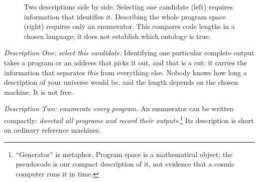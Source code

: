 \begin{figure}[h]
\centering
{}
\caption{Two descriptions side by side. Selecting one candidate (left) requires information that identifies it. Describing the whole program space (right) requires only an enumerator. This compares code lengths in a chosen language; it does not establish which ontology is true.}
\label{fig:cut-argument}
\end{figure}

\emph{Description One: select this candidate.} Identifying one particular complete output takes a program or an address that picks it out, and that is a cut: it carries the information that separates \emph{this} from everything else. Nobody knows how long a description of your universe would be, and the length depends on the chosen machine. It is not free.

\emph{Description Two: enumerate every program.} An enumerator can be written compactly: \emph{dovetail all programs and record their outputs}.\footnote{``Generator'' is metaphor. Program space is a mathematical object; the pseudocode is our compact description of it, not evidence that a cosmic computer runs it in time.} Its description is short on ordinary reference machines.

